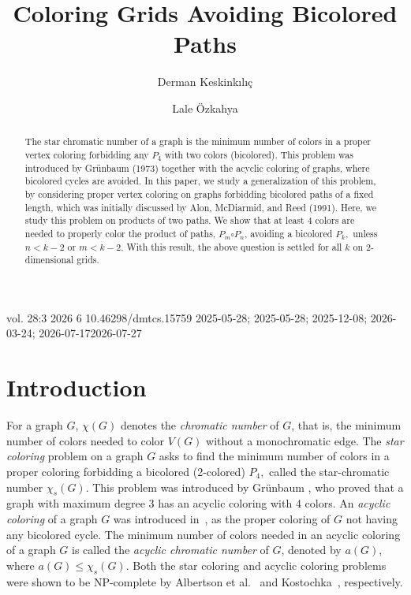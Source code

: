 \documentclass[
final, nomarks
]{dmtcs-episciences}
\author[Derman Keskinkılı\c{c} et al.]{Derman Keskinkılı\c{c}\affiliationmark{1}
  \and Lale \"Ozkahya\affiliationmark{1}}
\title[Coloring Grids Avoiding Bicolored Paths]{Coloring Grids Avoiding Bicolored Paths}
\affiliation{
  Hacettepe University, Department of Computer Engineering, Ankara, Turkey.}
\begin{document}
\publicationdata
{vol. 28:3}
{2026}
{6}
{10.46298/dmtcs.15759}
{2025-05-28; 2025-05-28; 2025-12-08; 2026-03-24; 2026-07-17}{2026-07-27}
\maketitle
\begin{abstract}
\vspace*{2ex} %
The star chromatic number of a graph 
is the minimum number of colors in a proper 
vertex coloring forbidding any $P_4$ with two colors (bicolored). This problem was introduced by Gr\"unbaum (1973) together with the acyclic coloring of graphs, where bicolored cycles are avoided.   
In this paper, we study a generalization of this problem, by considering proper vertex coloring on graphs forbidding bicolored  paths of a fixed length, which was initially discussed by Alon, McDiarmid, and Reed (1991). Here, we study this problem on products of two paths. 
We show that at least 4 colors are needed to properly color the  product of paths, $P_m\square P_n$, avoiding a bicolored $P_k,$ unless $n<k-2$ or $m<k-2.$ With this result, the above question is settled for all $k$ on 2-dimensional grids. 
\end{abstract}

\section{Introduction} \label{sec:introduction}

For a graph $G$, $\chi(G)$ denotes the {\it chromatic number} of $G$, that is, the minimum number of colors needed to color $V(G)$ without a monochromatic edge. 
The {\it star coloring} problem on a graph $G$ 
asks to find the minimum number of colors in a proper 
coloring forbidding a bicolored (2-colored) $P_4,$ called the star-chromatic 
number $\chi_s(G)$. This problem was introduced by Gr\"unbaum \cite{grunbaum1973acyclic}, who proved that a graph with maximum degree 3 has an acyclic coloring with 4 colors. 
An {\it acyclic coloring} of a graph $G$ was introduced in~\cite{grunbaum1973acyclic}, as the proper coloring of $G$ 
not having any bicolored cycle. The minimum number of colors needed in an acyclic coloring of a graph $G$ is called the {\it acyclic chromatic number} of $G$, denoted by $a(G)$, where $a(G)\leq \chi_s(G).$ Both the star coloring and 
acyclic coloring problems were shown to be NP-complete by Albertson et al.~\cite{albertson2004coloring} and Kostochka~\cite{kostochka1978upper}, respectively. 
\end{document}
